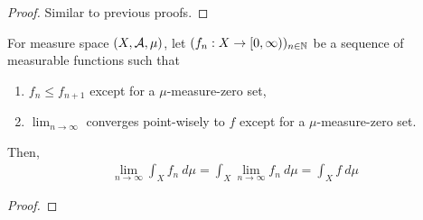 \documentclass[11pt]{article}
\begin{document}
	\begin{proof}
		Similar to previous proofs.
	\end{proof}
	
	\begin{theorem}
		For measure space $(X, \mathcal{{A}}, \mu)$, let $(f_n: X \to [0,\infty))_{n \in \mathbb{N}}$ be a sequence of measurable functions such that
		\begin{enumerate}
			\item $f_{n} \leq f_{n+1}$ except for a $\mu$-measure-zero set,
			\item $\lim_{n\to\infty}$ converges point-wisely to $f$ except for a $\mu$-measure-zero set.
		\end{enumerate}
		Then,
		\begin{align}
			\lim_{n \to \infty} \int_X f_n\ d\mu = \int_X \lim_{n \to \infty} f_n\ d\mu = \int_X f\ d\mu
		\end{align}
	\end{theorem}
	
	\begin{proof}
		
	\end{proof}
\end{document}
